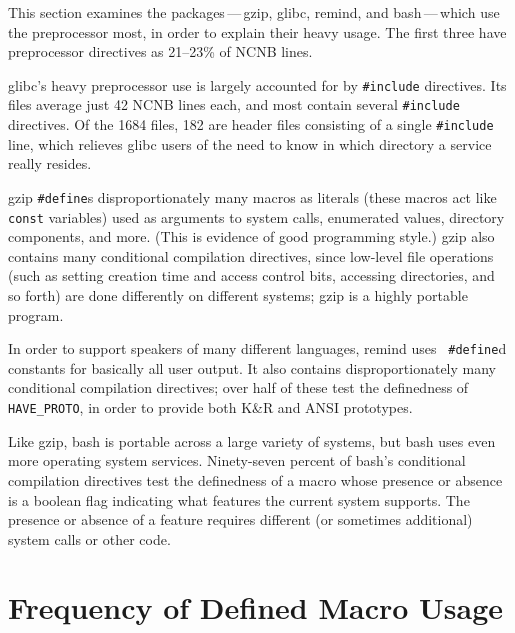 \documentclass[11pt]{article}
\begin{document}
This section examines the packages\,---\,gzip, glibc, remind, and
bash\,---\,which use the preprocessor most, in order to explain their heavy
usage.  The first three have preprocessor directives as 21--23\% of NCNB
lines.

glibc's heavy preprocessor use is largely accounted for by {\tt \#include}
directives.  Its files average just 42 NCNB lines each, and most contain
several {\tt \#include} directives.  Of the 1684 files, 182 are header files
consisting of a single {\tt \#include} line, which relieves glibc users of
the need to know in which directory a service really resides.

gzip {\tt \#define}s disproportionately many macros as literals (these
macros act like {\tt const} variables) used as arguments to system calls,
enumerated values, directory components, and more.  (This is evidence of
good programming style.)  gzip also contains many conditional compilation
directives, since low-level file operations (such as setting creation time
and access control bits, accessing directories, and so forth) are done
differently on different systems; gzip is a highly portable program.

In order to support speakers of many different languages, remind uses {\tt
\#define}d constants for basically all user output.  It also contains
disproportionately many conditional compilation directives; over half of
these test the definedness of \verb|HAVE_PROTO|, in order to provide both
K\&R and ANSI prototypes.  

Like gzip, bash is portable across a large variety of systems, but bash
uses even more operating system services.  Ninety-seven percent of bash's
conditional compilation directives test the definedness of a macro whose
presence or absence is a boolean flag indicating what features the current
system supports.  The presence or absence of a feature requires different
(or sometimes additional) system calls or other code.


\section{Frequency of Defined Macro Usage}
\label{sec:usage}


%
%
\end{document}
